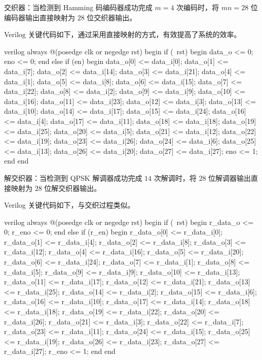 交织器：当检测到 Hamming 码编码器成功完成 $m=4$ 次编码时，将 $mn=28$ 位编码器输出直接映射为 $28$ 位交织器输出。

Verilog 关键代码如下，通过采用直接映射的方式，有效提高了系统的效率。

\begin{codeblock}{verilog}
always @(posedge clk or negedge rst) begin
    if (~rst) begin
        data_o <= 0;
        eno <= 0;
    end
    else if (en) begin
        data_o[0] <= data_i[0];
        data_o[1] <= data_i[7];
        data_o[2] <= data_i[14];
        data_o[3] <= data_i[21];
        data_o[4] <= data_i[1];
        data_o[5] <= data_i[8];
        data_o[6] <= data_i[15];
        data_o[7] <= data_i[22];
        data_o[8] <= data_i[2];
        data_o[9] <= data_i[9];
        data_o[10] <= data_i[16];
        data_o[11] <= data_i[23];
        data_o[12] <= data_i[3];
        data_o[13] <= data_i[10];
        data_o[14] <= data_i[17];
        data_o[15] <= data_i[24];
        data_o[16] <= data_i[4];
        data_o[17] <= data_i[11];
        data_o[18] <= data_i[18];
        data_o[19] <= data_i[25];
        data_o[20] <= data_i[5];
        data_o[21] <= data_i[12];
        data_o[22] <= data_i[19];
        data_o[23] <= data_i[26];
        data_o[24] <= data_i[6];
        data_o[25] <= data_i[13];
        data_o[26] <= data_i[20];
        data_o[27] <= data_i[27];
        eno <= 1;
    end
end
\end{codeblock}

解交织器：当检测到 QPSK 解调器成功完成 $14$ 次解调时，将 $28$ 位解调器输出直接映射为 $28$ 位解交织器输出。

Verilog 关键代码如下，与交织过程类似。

\begin{codeblock}{verilog}
always @(posedge clk or negedge rst) begin
    if (~rst) begin
        r_data_o <= 0;
        r_eno <= 0;
    end
    else if (r_en) begin
        r_data_o[0] <= r_data_i[0];
        r_data_o[1] <= r_data_i[4];
        r_data_o[2] <= r_data_i[8];
        r_data_o[3] <= r_data_i[12];
        r_data_o[4] <= r_data_i[16];
        r_data_o[5] <= r_data_i[20];
        r_data_o[6] <= r_data_i[24];
        r_data_o[7] <= r_data_i[1];
        r_data_o[8] <= r_data_i[5];
        r_data_o[9] <= r_data_i[9];
        r_data_o[10] <= r_data_i[13];
        r_data_o[11] <= r_data_i[17];
        r_data_o[12] <= r_data_i[21];
        r_data_o[13] <= r_data_i[25];
        r_data_o[14] <= r_data_i[2];
        r_data_o[15] <= r_data_i[6];
        r_data_o[16] <= r_data_i[10];
        r_data_o[17] <= r_data_i[14];
        r_data_o[18] <= r_data_i[18];
        r_data_o[19] <= r_data_i[22];
        r_data_o[20] <= r_data_i[26];
        r_data_o[21] <= r_data_i[3];
        r_data_o[22] <= r_data_i[7];
        r_data_o[23] <= r_data_i[11];
        r_data_o[24] <= r_data_i[15];
        r_data_o[25] <= r_data_i[19];
        r_data_o[26] <= r_data_i[23];
        r_data_o[27] <= r_data_i[27];
        r_eno <= 1;
    end
end
\end{codeblock}

